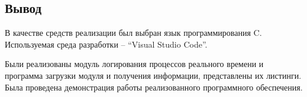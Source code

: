\subsection*{Вывод}
В качестве средств реализации был выбран язык программирования C. Используемая среда разработки -- ``Visual Studio Code''.

Были реализованы модуль логирования процессов реального времени и программа загрузки модуля и получения информации, представлены их листинги. Была проведена демонстрация работы реализованного программного обеспечения.
